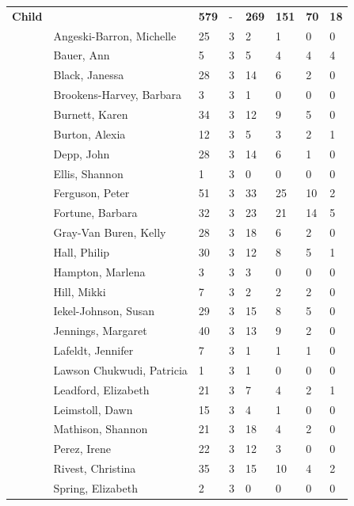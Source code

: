 \documentclass{article}\usepackage[]{graphicx}\usepackage[]{color}
\begin{document}
{\begin{longtable} { >{\raggedright}p{}p{}p{}p{}p{}p{}p{}p{}}
   \hline
\textbf{Child} &  & \textbf{579} & - & \textbf{269} & \textbf{151} & \textbf{70} & \textbf{18} \\ 
   & Angeski-Barron, Michelle & 25 & 3 & 2 & 1 & 0 & 0 \\ 
   & Bauer, Ann & 5 & 3 & 5 & 4 & 4 & 4 \\ 
   & Black, Janessa & 28 & 3 & 14 & 6 & 2 & 0 \\ 
   \rowcolor[gray]{0.90} & Brookens-Harvey, Barbara & 3 & 3 & 1 & 0 & 0 & 0 \\ 
   \rowcolor[gray]{0.90} & Burnett, Karen & 34 & 3 & 12 & 9 & 5 & 0 \\ 
   \rowcolor[gray]{0.90} & Burton, Alexia & 12 & 3 & 5 & 3 & 2 & 1 \\ 
   & Depp, John & 28 & 3 & 14 & 6 & 1 & 0 \\ 
   & Ellis, Shannon & 1 & 3 & 0 & 0 & 0 & 0 \\ 
   & Ferguson, Peter & 51 & 3 & 33 & 25 & 10 & 2 \\ 
   \rowcolor[gray]{0.90} & Fortune, Barbara & 32 & 3 & 23 & 21 & 14 & 5 \\ 
   \rowcolor[gray]{0.90} & Gray-Van Buren, Kelly & 28 & 3 & 18 & 6 & 2 & 0 \\ 
   \rowcolor[gray]{0.90} & Hall, Philip & 30 & 3 & 12 & 8 & 5 & 1 \\ 
   & Hampton, Marlena & 3 & 3 & 3 & 0 & 0 & 0 \\ 
   & Hill, Mikki & 7 & 3 & 2 & 2 & 2 & 0 \\ 
   & Iekel-Johnson, Susan & 29 & 3 & 15 & 8 & 5 & 0 \\ 
   \rowcolor[gray]{0.90} & Jennings, Margaret & 40 & 3 & 13 & 9 & 2 & 0 \\ 
   \rowcolor[gray]{0.90} & Lafeldt, Jennifer & 7 & 3 & 1 & 1 & 1 & 0 \\ 
   \rowcolor[gray]{0.90} & Lawson Chukwudi, Patricia & 1 & 3 & 1 & 0 & 0 & 0 \\ 
   & Leadford, Elizabeth & 21 & 3 & 7 & 4 & 2 & 1 \\ 
   & Leimstoll, Dawn & 15 & 3 & 4 & 1 & 0 & 0 \\ 
   & Mathison, Shannon & 21 & 3 & 18 & 4 & 2 & 0 \\ 
   \rowcolor[gray]{0.90} & Perez, Irene & 22 & 3 & 12 & 3 & 0 & 0 \\ 
   \rowcolor[gray]{0.90} & Rivest, Christina & 35 & 3 & 15 & 10 & 4 & 2 \\ 
   \rowcolor[gray]{0.90} & Spring, Elizabeth & 2 & 3 & 0 & 0 & 0 & 0 \\ 

\end{longtable}}
\end{document}

